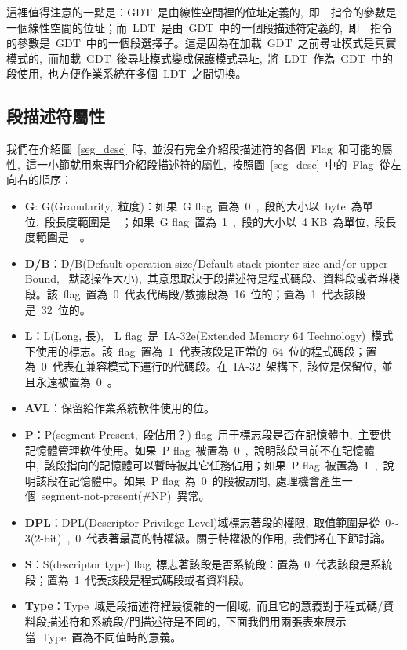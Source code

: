這裡值得注意的一點是：GDT~是由線性空間裡的位址定義的,~即~~指令的參數是一個線性空間的位址；而~LDT~是由~GDT~中的一個段描述符定義的,~即~~指令的參數是~GDT~中的一個段選擇子。這是因為在加載~GDT~之前尋址模式是真實模式的,~而加載~GDT~後尋址模式變成保護模式尋址,~將~LDT~作為~GDT~中的段使用,~也方便作業系統在多個~LDT~之間切換。

\subsection{段描述符屬性} \label{CHpm_desattr}

我們在介紹圖~\ref{seg_desc}~時,~並沒有完全介紹段描述符的各個~Flag~和可能的屬性,~這一小節就用來專門介紹段描述符的屬性,~按照圖~\ref{seg_desc}~中的~Flag~從左向右的順序：

\begin{itemize}
\item{\textbf{G}}: G(Granularity,~粒度)：如果~G flag~置為~0~,~段的大小以~byte~為單位,~段長度範圍是~~；如果~G flag~置為~1~,~段的大小以~4 KB~為單位,~段長度範圍是~~。
\item{\textbf{D/B}}：D/B(Default operation size/Default stack pionter size and/or upper Bound,~ 默認操作大小),~其意思取決于段描述符是程式碼段、資料段或者堆棧段。該~flag~置為~0~代表代碼段/數據段為~16~位的；置為~1~代表該段是~32~位的。
\item{\textbf{L}}：L(Long, 長),~~L flag~是~IA-32e(Extended Memory 64 Technology)~模式下使用的標志。該~flag~置為~1~代表該段是正常的~64~位的程式碼段；置為~0~代表在兼容模式下運行的代碼段。在~IA-32~架構下,~該位是保留位,~並且永遠被置為~0~。
\item{\textbf{AVL}}：保留給作業系統軟件使用的位。
\item{\textbf{P}}：P(segment-Present,~段佔用？) flag~用于標志段是否在記憶體中,~主要供記憶體管理軟件使用。如果~P flag~被置為~0~,~說明該段目前不在記憶體中,~該段指向的記憶體可以暫時被其它任務佔用；如果~P flag~被置為~1~,~說明該段在記憶體中。如果~P flag~為~0~的段被訪問,~處理機會產生一個~segment-not-present(\#NP)~異常。
\item{\textbf{DPL}}：DPL(Descriptor Privilege Level)域標志著段的權限,~取值範圍是從~0$\sim$3(2-bit)~,~0~代表著最高的特權級。關于特權級的作用,~我們將在下節討論。
\item{\textbf{S}}：S(descriptor type) flag~標志著該段是否系統段：置為~0~代表該段是系統段；置為~1~代表該段是程式碼段或者資料段。
\item{\textbf{Type}}：Type~域是段描述符裡最復雜的一個域,~而且它的意義對于程式碼/資料段描述符和系統段/門描述符是不同的,~下面我們用兩張表來展示當~Type~置為不同值時的意義。


\end{itemize}
